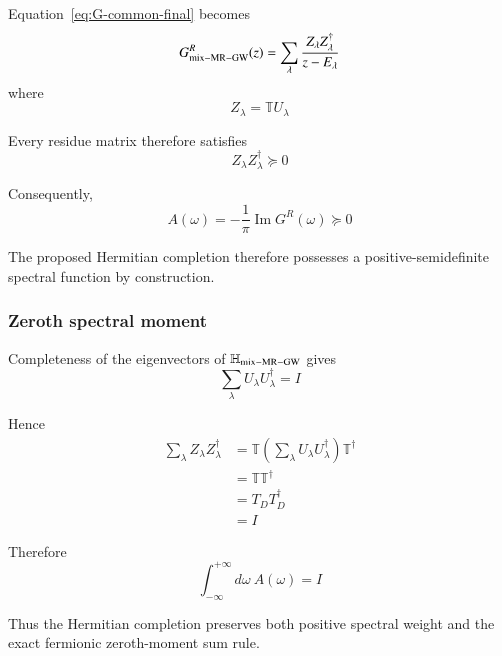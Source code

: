 \documentclass[aip,jcp,reprint,noshowkeys,superscriptaddress]{revtex4-1}
\begin{document}
Equation~\eqref{eq:G-common-final} becomes
\begin{equation}
  G_{\rm mix-MR-GW}^{R}(z)
  =
  \sum_\lambda
  \frac{
    Z_\lambda Z_\lambda^\dagger
  }{
    z-E_\lambda
  }
  \label{eq:G-positive-Lehmann}
\end{equation}
where
\begin{equation}
  Z_\lambda
  =
  \mathbb T U_\lambda
\end{equation}

Every residue matrix therefore satisfies
\begin{equation}
  Z_\lambda Z_\lambda^\dagger
  \succeq
  0
\end{equation}

Consequently,
\begin{equation}
  A(\omega)
  =
  -\frac{1}{\pi}
  \operatorname{Im}
  G^R(\omega)
  \succeq
  0
  \label{eq:spectral-PSD}
\end{equation}

The proposed Hermitian completion therefore possesses a
positive-semidefinite spectral function by construction.


\subsubsection{Zeroth spectral moment}

Completeness of the eigenvectors of
$\mathbb H_{\rm mix-MR-GW}$ gives
\begin{equation}
  \sum_\lambda
  U_\lambda U_\lambda^\dagger
  =
  I
\end{equation}

Hence
\begin{equation}
  \begin{aligned}
  \sum_\lambda
  Z_\lambda Z_\lambda^\dagger
  &=
  \mathbb T
  \left(
    \sum_\lambda
    U_\lambda U_\lambda^\dagger
  \right)
  \mathbb T^\dagger
  \\
  &=
  \mathbb T\mathbb T^\dagger
  \\
  &=
  T_DT_D^\dagger
  \\
  &=
  I
  \end{aligned}
\end{equation}

Therefore
\begin{equation}
  \int_{-\infty}^{+\infty}
  d\omega\
  A(\omega)
  =
  I
  \label{eq:zeroth-moment-exact}
\end{equation}

Thus the Hermitian completion preserves both positive spectral weight
and the exact fermionic zeroth-moment sum rule.
\end{document}
